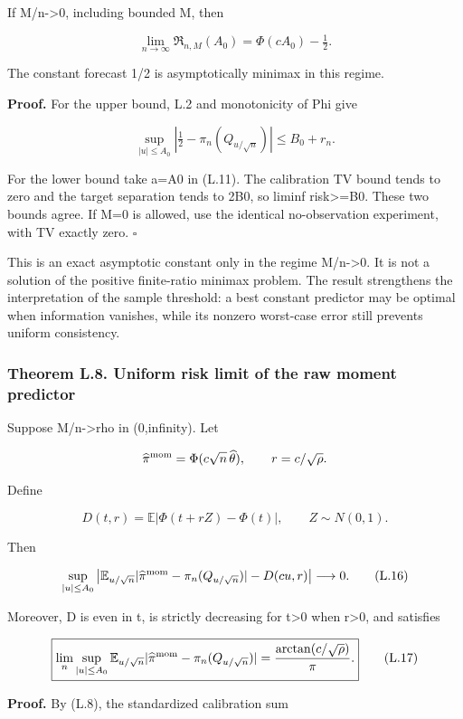 If M/n-\textgreater0, including bounded M, then

\[
\boxed{\lim_{n\to\infty}\mathfrak R_{n,M}(A_0)
=\Phi(cA_0)-\tfrac12.}
\tag{L.15}
\]

The constant forecast 1/2 is asymptotically minimax in this regime.

\textbf{Proof.} For the upper bound, L.2 and monotonicity of Phi give

\[
\sup_{|u|\le A_0}|\tfrac12-\pi_n(Q_{u/\sqrt n})|
\le B_0+r_n.
\]

For the lower bound take a=A0 in (L.11). The calibration TV bound tends
to zero and the target separation tends to 2B0, so liminf
risk\textgreater=B0. These two bounds agree. If M=0 is allowed, use the
identical no-observation experiment, with TV exactly zero. \(\square\)

This is an exact asymptotic constant only in the regime
M/n-\textgreater0. It is not a solution of the positive finite-ratio
minimax problem. The result strengthens the interpretation of the sample
threshold: a best constant predictor may be optimal when information
vanishes, while its nonzero worst-case error still prevents uniform
consistency.

\subsubsection{Theorem L.8. Uniform risk limit of the raw moment
predictor}\label{local_prediction-theorem-l.8.-uniform-risk-limit-of-the-raw-moment-predictor}

Suppose M/n-\textgreater rho in (0,infinity). Let

\[
\widehat\pi^{\rm mom}=\Phi(c\sqrt n\,\widehat\theta),
\qquad r=c/\sqrt\rho.
\]

Define

\[
D(t,r)=\mathbb E|\Phi(t+rZ)-\Phi(t)|,
\qquad Z\sim N(0,1).
\]

Then

\[
\sup_{|u|\le A_0}
\left|\mathbb E_{u/\sqrt n}
 |\widehat\pi^{\rm mom}-\pi_n(Q_{u/\sqrt n})|
-D(cu,r)\right|\longrightarrow0.
\tag{L.16}
\]

Moreover, D is even in t, is strictly decreasing for t\textgreater0 when
r\textgreater0, and satisfies

\[
\boxed{\lim_n\sup_{|u|\le A_0}
\mathbb E_{u/\sqrt n}
 |\widehat\pi^{\rm mom}-\pi_n(Q_{u/\sqrt n})|
=\frac{\arctan(c/\sqrt\rho)}{\pi}.}
\tag{L.17}
\]

\textbf{Proof.} By (L.8), the standardized calibration sum

